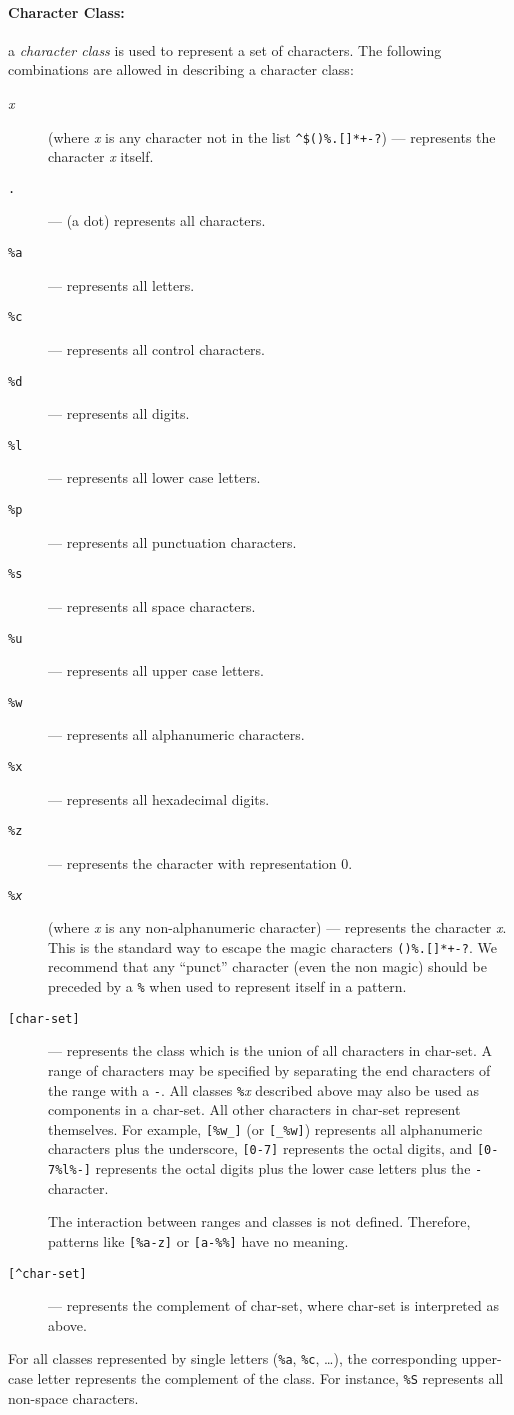 \documentclass[11pt]{article}
\newcommand{\M}[1]{\rm\emph{#1}}
\newcommand{\T}[1]{{\tt #1}}
\newcommand{\Def}[1]{\emph{#1}\index{#1}}
\begin{document}
\paragraph{Character Class:}
a \Def{character class} is used to represent a set of characters.
The following combinations are allowed in describing a character class:
\begin{description}
\item[\emph{x}] (where \emph{x} is any character not in the list
\verb|^$()%.[]*+-?|)
--- represents the character \emph{x} itself.
\item[\T{.}] --- (a dot) represents all characters.
\item[\T{\%a}] --- represents all letters.
\item[\T{\%c}] --- represents all control characters.
\item[\T{\%d}] --- represents all digits.
\item[\T{\%l}] --- represents all lower case letters.
\item[\T{\%p}] --- represents all punctuation characters.
\item[\T{\%s}] --- represents all space characters.
\item[\T{\%u}] --- represents all upper case letters.
\item[\T{\%w}] --- represents all alphanumeric characters.
\item[\T{\%x}] --- represents all hexadecimal digits.
\item[\T{\%z}] --- represents the character with representation 0.
\item[\T{\%\M{x}}] (where \M{x} is any non-alphanumeric character)  ---
represents the character \M{x}.
This is the standard way to escape the magic characters \verb|()%.[]*+-?|.
We recommend that any ``punct'' character (even the non magic)
should be preceded by a \verb|%|
when used to represent itself in a pattern.

\item[\T{[char-set]}] ---
represents the class which is the union of all
characters in char-set.
A range of characters may be specified by
separating the end characters of the range with a \verb|-|.
All classes \verb|%|\emph{x} described above may also be used as
components in a char-set.
All other characters in char-set represent themselves.
For example, \verb|[%w_]| (or \verb|[_%w]|)
represents all alphanumeric characters plus the underscore,
\verb|[0-7]| represents the octal digits,
and \verb|[0-7%l%-]| represents the octal digits plus
the lower case letters plus the \verb|-| character.

The interaction between ranges and classes is not defined.
Therefore, patterns like \verb|[%a-z]| or \verb|[a-%%]|
have no meaning.

\item[\T{[\^{ }char-set]}] ---
represents the complement of char-set,
where char-set is interpreted as above.
\end{description}
For all classes represented by single letters (\verb|%a|, \verb|%c|, \ldots),
the corresponding upper-case letter represents the complement of the class.
For instance, \verb|%S| represents all non-space characters.
\end{document}

